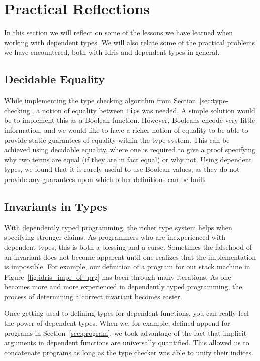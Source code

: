 \section{Practical Reflections}
\label{sec:practical-reflections}
In this section we will reflect on some of the lessons we have learned when working with dependent types. We will also relate some of the practical problems we have encountered, both with Idris and dependent types in general.

\subsection{Decidable Equality}
While implementing the type checking algorithm from Section~\ref{sec:type-checking}, a notion of equality between \texttt{Tip}s was needed. A simple solution would be to implement this as a Boolean function. However, Booleans encode very little information, and we would like to have a richer notion of equality to be able to provide static guarantees of equality within the type system. This can be achieved using decidable equality, where one is required to give a proof specifying why two terms are equal (if they are in fact equal) or why not. Using dependent types, we found that it is rarely useful to use Boolean values, as they do not provide any guarantees upon which other definitions can be built.

\subsection{Invariants in Types}
With dependently typed programming, the richer type system helps when specifying stronger claims. As programmers who are inexperienced with dependent types, this is both a blessing and a curse. Sometimes the falsehood of an invariant does not become apparent until one realizes that the implementation is impossible. For example, our definition of a program for our stack machine in Figure~\ref{fig:idris_impl_of_prg} has been through many iterations. As one becomes more and more experienced in dependently typed programming, the process of determining a correct invariant becomes easier.

Once getting used to defining types for dependent functions, you can really feel the power of dependent types. When we, for example, defined append for programs in Section~\ref{sec:program}, we took advantage of the fact that implicit arguments in dependent functions are universally quantified. This allowed us to concatenate programs as long as the type checker was able to unify their indices.

